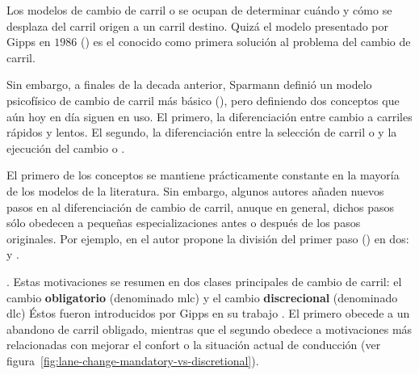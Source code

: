 Los modelos de cambio de carril o \textit{} se ocupan de determinar cuándo y cómo se desplaza del carril origen a un carril destino. Quizá el modelo presentado por Gipps en $1986$ (\cite{Gipps1986}) es el conocido como primera solución al problema del cambio de carril.

Sin embargo, a finales de la decada anterior, Sparmann definió un modelo psicofísico de cambio de carril más básico (\cite{Sparmann1978}), pero definiendo dos conceptos que aún hoy en día siguen en uso. El primero, la diferenciación entre cambio a carriles rápidos y lentos. El segundo, la diferenciación entre la selección de carril o \textbf{} y la ejecución del cambio o \textbf{}.

El primero de los conceptos se mantiene prácticamente constante en la mayoría de los modelos de la literatura. Sin embargo, algunos autores añaden nuevos pasos en al diferenciación de cambio de carril, anuque en general, dichos pasos sólo obedecen a pequeñas especializaciones antes o después de los pasos originales. Por ejemplo, en \cite{Ahmed1999} el autor propone la división del primer paso (\textit{}) en dos: \textit{} y \textbf{}.

. Estas motivaciones se resumen en dos clases principales de cambio de carril: el cambio \textbf{obligatorio} (denominado \gls{mlc}) y el cambio \textbf{discrecional} (denominado \gls{dlc}) Éstos fueron introducidos por Gipps en su trabajo \cite{Gipps1986}. El primero obecede a un abandono de carril obligado, mientras que el segundo obedece a motivaciones más relacionadas con mejorar el confort o la situación actual de conducción (ver figura~\ref{fig:lane-change-mandatory-vs-discretional}).

